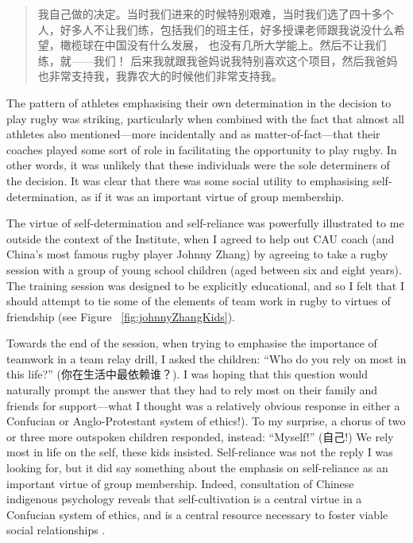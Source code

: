 \begin{CJK}{UTF8}{gbsn}
    \begin{quotation}
      我自己做的决定。当时我们进来的时候特别艰难，当时我们选了四十多个人，好多人不让我们练，包括我们的班主任，好多授课老师跟我说没什么希望，橄榄球在中国没有什么发展， 也没有几所大学能上。然后不让我们练，就——我们！ 后来我就跟我爸妈说我特别喜欢这个项目，然后我爸妈也非常支持我，我靠农大的时候他们非常支持我。
    \end{quotation}


The pattern of athletes emphasising their own determination in the decision to play rugby was striking, particularly when combined with the fact that almost all athletes also mentioned---more incidentally and as matter-of-fact---that their coaches played some sort of role in facilitating the opportunity to play rugby.  In other words, it was unlikely that these individuals were the sole determiners of the decision.  It was clear that there was some social utility to emphasising self-determination, as if it was an important virtue of group membership.

The virtue of self-determination and self-reliance was powerfully illustrated to me outside the context of the Institute, when I agreed to help out CAU coach (and China's most famous rugby player Johnny Zhang) by agreeing to take a rugby session with a group of young school children (aged between six and eight years).  The training session was designed to be explicitly educational, and so I felt that I should attempt to tie some of the elements of team work in rugby to virtues of friendship (see Figure ~\ref{fig:johnnyZhangKids}).

Towards the end of the session, when trying to emphasise the importance of teamwork in a team relay drill, I asked the children: ``Who do you rely on most in this life?'' (你在生活中最依赖谁？).  I was hoping that this question would naturally prompt the answer that they had to rely most on their family and friends for support---what I thought was a relatively obvious response in either a Confucian or Anglo-Protestant system of ethics!).  To my surprise, a chorus of two or three more outspoken children responded, instead: ``Myself!'' (自己!) We rely most in life on the self, these kids insisted. Self-reliance was not the reply I was looking for, but it did say something about the emphasis on self-reliance as an important virtue of group membership.  Indeed, consultation of Chinese indigenous psychology reveals that self-cultivation is a central virtue in a Confucian system of ethics, and is a central resource necessary to foster viable social relationships \citep{Liu2014}.



\end{CJK}
